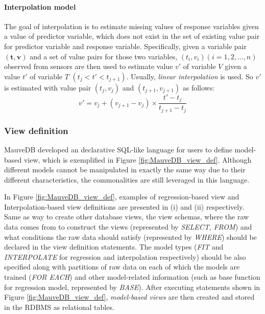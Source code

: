 \paragraph{Interpolation model} 

The goal of interpolation is to estimate missing values of response variables given a value of predictor variable, which does not exist in the set of existing value pair for predictor variable and response variable. Specifically, given a variable pair $(\textbf{t},\textbf{v})$ and a set of value pairs for those two variables, $(t_i, v_i)(i=1,2,\dots,n)$ observed from sensors are then used to estimate value $v'$ of variable $V$ given a value $t'$ of variable $T$ $(t_j< t' < t_{j+1})$. Usually, {\em linear interpolation} is used. So $v'$ is estimated with value pair $(t_j, v_j)$ and $(t_{j+1}, v_{j+1})$ as follows:
\begin{equation}\label{eq: interpolation}
    v'= v_j + (v_{j+1}-v_j)\times\frac{t'-t_j}{t_{j+1}-t_j}
\end{equation}




\subsubsection{View definition}

MauveDB developed an declarative SQL-like language for users to define model-based view, which is exemplified in Figure \ref{fig:MauveDB_view_def}. Although different models cannot be manipulated in exactly the same way due to their different characteristics, the commonalities are still leveraged in this language. 

In Figure \ref{fig:MauveDB_view_def}, examples of regression-based view and Interpolation-based view definitions are presented in (i) and (ii) respectively. Same as way to create other database views, the view schemas, where the raw data comes from to construct the views (represented by \textit{SELECT}, \textit{FROM}) and what conditions the raw data should satisfy (represented by \textit{WHERE}) should be declared in the view definition statements. The model types (\textit{FIT} and \textit{INTERPOLATE} for regression and interpolation respectively) should be also specified along with partitions of raw data on each of which the models are trained (\textit{FOR EACH}) and other model-related information (such as base function for regression model, represented by \textit{BASE}). After executing statements shown in Figure \ref{fig:MauveDB_view_def}, {\em model-based views} are then created and stored in the RDBMS as relational tables.


